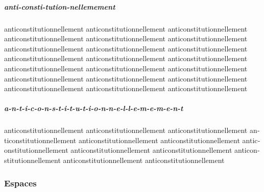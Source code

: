 \documentclass[
  a4paper,
]{book}
\begin{document}
\hypertarget{anti-consti-tution-nellemement}{%
\subparagraph{anti-consti-tution-nellemement}\label{anti-consti-tution-nellemement}}

anti­consti­tution­nellement anti­consti­tution­nellement anti­consti­tution­nellement anti­consti­tution­nellement anti­consti­tution­nellement anti­consti­tution­nellement anti­consti­tution­nellement anti­consti­tution­nellement anti­consti­tution­nellement anti­consti­tution­nellement anti­consti­tution­nellement anti­consti­tution­nellement anti­consti­tution­nellement anti­consti­tution­nellement anti­consti­tution­nellement anti­consti­tution­nellement anti­consti­tution­nellement anti­consti­tution­nellement anti­consti­tution­nellement anti­consti­tution­nellement anti­consti­tution­nellement

\hypertarget{a-n-t-i-c-o-n-s-t-i-t-u-t-i-o-n-n-e-l-l-e-m-e-m-e-n-t}{%
\subparagraph{a-n-t-i-c-o-n-s-t-i-t-u-t-i-o-n-n-e-l-l-e-m-e-m-e-n-t}\label{a-n-t-i-c-o-n-s-t-i-t-u-t-i-o-n-n-e-l-l-e-m-e-m-e-n-t}}

a­n­t­i­c­o­n­s­t­i­t­u­t­i­o­n­n­e­l­l­e­m­e­n­t­ a­n­t­i­c­o­n­s­t­i­t­u­t­i­o­n­n­e­l­l­e­m­e­n­t­ a­n­t­i­c­o­n­s­t­i­t­u­t­i­o­n­n­e­l­l­e­m­e­n­t­ a­n­t­i­c­o­n­s­t­i­t­u­t­i­o­n­n­e­l­l­e­m­e­n­t­ a­n­t­i­c­o­n­s­t­i­t­u­t­i­o­n­n­e­l­l­e­m­e­n­t­ a­n­t­i­c­o­n­s­t­i­t­u­t­i­o­n­n­e­l­l­e­m­e­n­t­ a­n­t­i­c­o­n­s­t­i­t­u­t­i­o­n­n­e­l­l­e­m­e­n­t­ a­n­t­i­c­o­n­s­t­i­t­u­t­i­o­n­n­e­l­l­e­m­e­n­t­ a­n­t­i­c­o­n­s­t­i­t­u­t­i­o­n­n­e­l­l­e­m­e­n­t­ a­n­t­i­c­o­n­s­t­i­t­u­t­i­o­n­n­e­l­l­e­m­e­n­t­ a­n­t­i­c­o­n­s­t­i­t­u­t­i­o­n­n­e­l­l­e­m­e­n­t­ a­n­t­i­c­o­n­s­t­i­t­u­t­i­o­n­n­e­l­l­e­m­e­n­t­

\hypertarget{espaces}{%
\subsubsection{Espaces}\label{espaces}}
\end{document}
